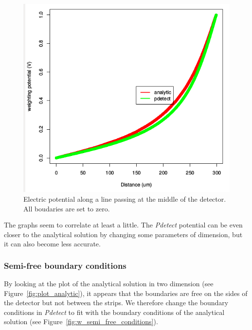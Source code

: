 \documentclass[11pt]{article}
\begin{document}
			\begin{figure}[H]
				\center
				\includegraphics[scale=0.5]{images/boundary_conditions/zero_conditions.png}
				\caption{Electric potential along a line passing at the middle of the detector. 
						All boudaries are set to zero.}
				\label{fig:zero_conditions}
			\end{figure}
\newpage
			The graphs seem to correlate at least a little. The \textit{Pdetect} potential can 
			be even closer to the analytical solution by changing some parameters of dimension, 
			but it can also become less accurate.

		\subsubsection{Semi-free boundary conditions}

			By looking at the plot of the analytical solution in two dimension 
			(see Figure~\ref{fig:plot_analytic}), it appears that the boundaries are
			free on the sides of the detector but not between the strips. We therefore change
			the boundary conditions in \textit{Pdetect} to fit with the boundary conditions of
			the analytical solution (see Figure~\ref{fig:w_semi_free_conditions}).
\end{document}

